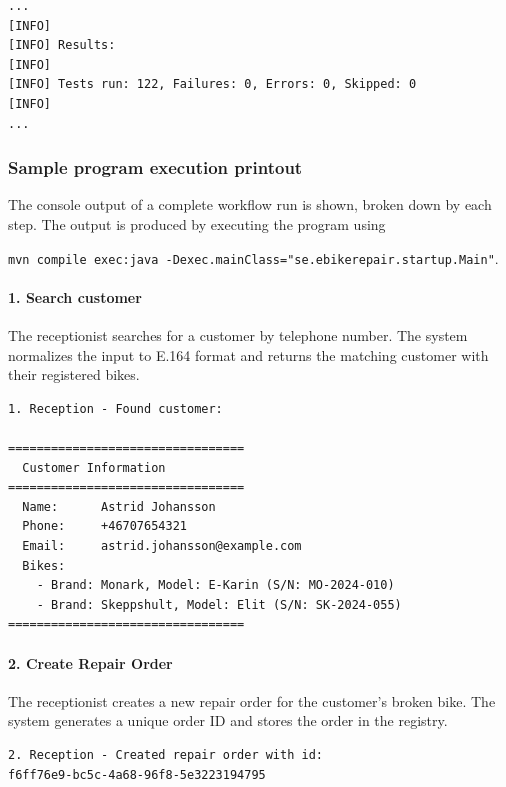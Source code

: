 \documentclass[a4paper]{scrartcl}
\begin{document}
\begin{lstlisting}[style=outputstyle, caption={JUnit test execution summary}, label={fig:sample-test}]
...
[INFO]
[INFO] Results:
[INFO]
[INFO] Tests run: 122, Failures: 0, Errors: 0, Skipped: 0
[INFO]
...
\end{lstlisting}

\subsubsection{Sample program execution printout}
The console output of a complete workflow run is shown, broken down by each step. The output is produced by executing the program using

\texttt{mvn compile exec:java -Dexec.mainClass="se.ebikerepair.startup.Main"}.

\paragraph{1. Search customer} 
The receptionist searches for a customer by telephone number. The system normalizes the input to E.164 format and returns the matching customer with their registered bikes.

\begin{lstlisting}[style=outputstyle, caption={Printout from search customer system operation}, label={fig:run-search-customer}]
1. Reception - Found customer:

=================================
  Customer Information
=================================
  Name:      Astrid Johansson
  Phone:     +46707654321
  Email:     astrid.johansson@example.com
  Bikes:
    - Brand: Monark, Model: E-Karin (S/N: MO-2024-010)
    - Brand: Skeppshult, Model: Elit (S/N: SK-2024-055)
=================================
\end{lstlisting}

\paragraph{2. Create Repair Order} 
The receptionist creates a new repair order for the customer's broken bike. The system generates a unique order ID and stores the order in the registry.

\begin{lstlisting}[style=outputstyle, caption={Printout from create repair order system operation}, label={fig:run-create-repair-order}]
2. Reception - Created repair order with id:
f6ff76e9-bc5c-4a68-96f8-5e3223194795
\end{lstlisting}
\end{document}
